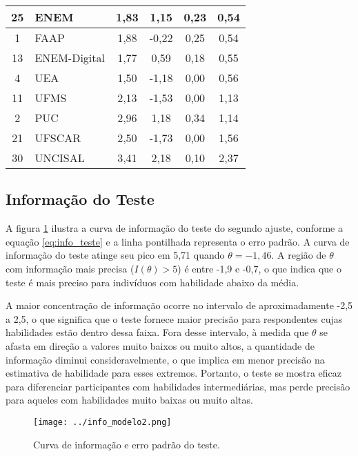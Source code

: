 \begin{table}[H]
{\begin{tabular*}{.8\textwidth}{@{\extracolsep{\fill}}clcccc@{}}
\midrule 25 & ENEM & 1,83 & 1,15 & 0,23 & 0,54 \\ 
\midrule 1 & FAAP & 1,88 & -0,22 & 0,25 & 0,54 \\ 
\midrule 13 & ENEM-Digital & 1,77 & 0,59 & 0,18 & 0,55 \\ 
\midrule 4 & UEA & 1,50 & -1,18 & 0,00 & 0,56 \\ 
\midrule 11 & UFMS & 2,13 & -1,53 & 0,00 & 1,13 \\ 
\midrule 2 & PUC & 2,96 & 1,18 & 0,34 & 1,14 \\ 
\midrule 21 & UFSCAR & 2,50 & -1,73 & 0,00 & 1,56 \\ 
\midrule 30 & UNCISAL & 3,41 & 2,18 & 0,10 & 2,37 \\
\bottomrule
		\end{tabular*}
	}{%
			}
\end{table}



\subsection{Informação do Teste}

A figura \ref{fig:info} ilustra a curva de informação do teste do segundo ajuste, conforme a equação \ref{eq:info_teste} e a linha pontilhada representa o erro padrão. A curva de informação do teste atinge seu pico em 5,71 quando $\theta = -1,46$. A região de $\theta$ com informação mais precisa ($I(\theta) > 5$) é entre -1,9 e -0,7, o que indica que o teste é mais preciso para indivíduos com habilidade abaixo da média. 

A maior concentração de informação ocorre no intervalo de aproximadamente -2,5 a 2,5, o que significa que o teste fornece maior precisão para respondentes cujas habilidades estão dentro dessa faixa. Fora desse intervalo, à medida que $\theta$ se afasta em direção a valores muito baixos ou muito altos, a quantidade de informação diminui consideravelmente, o que implica em menor precisão na estimativa de habilidade para esses extremos. Portanto, o teste se mostra eficaz para diferenciar participantes com habilidades intermediárias, mas perde precisão para aqueles com habilidades muito baixas ou muito altas.

\begin{figure}[!htbp]
	\centering
	\texttt{[image: ../info\_modelo2.png]}
	\caption{Curva de informação e erro padrão do teste.}
	\label{fig:info}
\end{figure}



